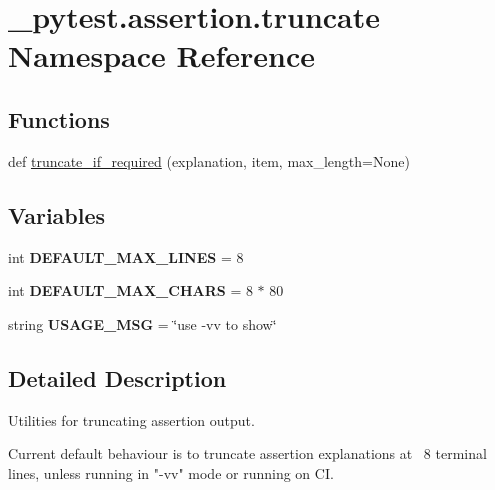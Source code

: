 \hypertarget{namespace__pytest_1_1assertion_1_1truncate}{}\section{\+\_\+pytest.\+assertion.\+truncate Namespace Reference}
\label{namespace__pytest_1_1assertion_1_1truncate}
\subsection*{Functions}
\begin{DoxyCompactItemize}
\item 
def \hyperlink{namespace__pytest_1_1assertion_1_1truncate_a1bb7afee542e1bf852d62bdcd8b8c9ba}{truncate\+\_\+if\+\_\+required} (explanation, item, max\+\_\+length=None)
\end{DoxyCompactItemize}
\subsection*{Variables}
\begin{DoxyCompactItemize}
\item 
\mbox{\label{namespace__pytest_1_1assertion_1_1truncate_a4497c8b22011c46aab69b3a6bedf5ae4}} 
int {\bfseries D\+E\+F\+A\+U\+L\+T\+\_\+\+M\+A\+X\+\_\+\+L\+I\+N\+ES} = 8
\item 
\mbox{\label{namespace__pytest_1_1assertion_1_1truncate_a4bddbd45cd76f12a0966ff6ee02fb36c}} 
int {\bfseries D\+E\+F\+A\+U\+L\+T\+\_\+\+M\+A\+X\+\_\+\+C\+H\+A\+RS} = 8 $\ast$ 80
\item 
\mbox{\label{namespace__pytest_1_1assertion_1_1truncate_aba403243747fbc808fd56c1d11ffa620}} 
string {\bfseries U\+S\+A\+G\+E\+\_\+\+M\+SG} = \char`\"{}use \textquotesingle{}-\/vv\textquotesingle{} to show\char`\"{}
\end{DoxyCompactItemize}


\subsection{Detailed Description}
\begin{DoxyVerb}Utilities for truncating assertion output.

Current default behaviour is to truncate assertion explanations at
~8 terminal lines, unless running in "-vv" mode or running on CI.
\end{DoxyVerb}
 

